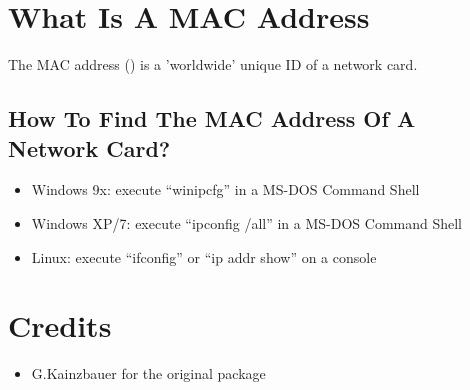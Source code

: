 \section {What Is A MAC Address}

The MAC address () is a
'worldwide' unique ID of a network card.

\subsection{How To Find The MAC Address Of A Network Card?}
\begin{itemize}
	\item Windows 9x: execute ``winipcfg'' in a MS-DOS Command Shell
	\item Windows XP/7: execute ``ipconfig /all'' in a MS-DOS Command Shell
	\item Linux: execute ``ifconfig'' or ``ip addr show'' on a console
\end{itemize}

\section {Credits}
\begin{itemize}
    \item G.Kainzbauer for the original package
\end{itemize}
